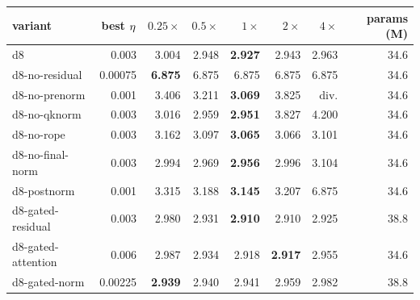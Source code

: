 \begin{tabular}{lrrrrrrr}\toprule
variant & best $\eta$ & $0.25\times$ & $0.5\times$ & $1\times$ & $2\times$ & $4\times$ & params (M)\\\midrule
d8 & 0.003 & 3.004 & 2.948 & \textbf{2.927} & 2.943 & 2.963 & 34.6 \\
d8-no-residual & 0.00075 & \textbf{6.875} & 6.875 & 6.875 & 6.875 & 6.875 & 34.6 \\
d8-no-prenorm & 0.001 & 3.406 & 3.211 & \textbf{3.069} & 3.825 & div. & 34.6 \\
d8-no-qknorm & 0.003 & 3.016 & 2.959 & \textbf{2.951} & 3.827 & 4.200 & 34.6 \\
d8-no-rope & 0.003 & 3.162 & 3.097 & \textbf{3.065} & 3.066 & 3.101 & 34.6 \\
d8-no-final-norm & 0.003 & 2.994 & 2.969 & \textbf{2.956} & 2.996 & 3.104 & 34.6 \\
d8-postnorm & 0.001 & 3.315 & 3.188 & \textbf{3.145} & 3.207 & 6.875 & 34.6 \\
d8-gated-residual & 0.003 & 2.980 & 2.931 & \textbf{2.910} & 2.910 & 2.925 & 38.8 \\
d8-gated-attention & 0.006 & 2.987 & 2.934 & 2.918 & \textbf{2.917} & 2.955 & 34.6 \\
d8-gated-norm & 0.00225 & \textbf{2.939} & 2.940 & 2.941 & 2.959 & 2.982 & 38.8 \\
\bottomrule\end{tabular}
